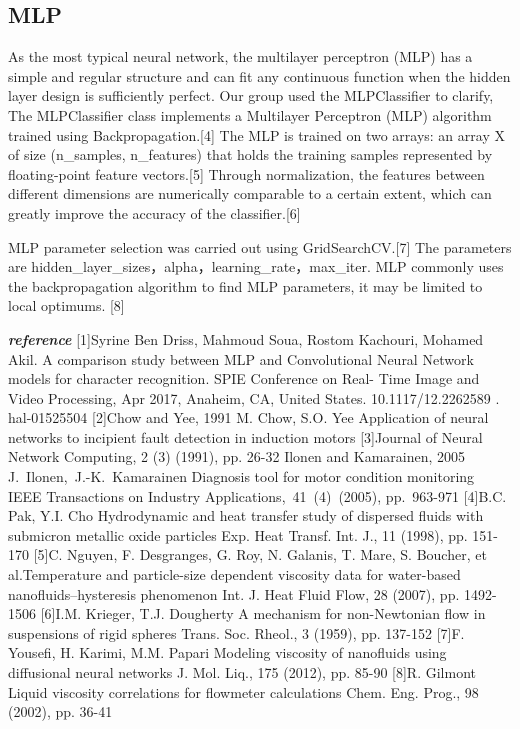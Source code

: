 \subsection{MLP}\label{subsubsec4}
As the most typical neural network, the multilayer perceptron (MLP) has a simple and regular structure and can fit any continuous function when the hidden layer design is sufficiently perfect. Our group used the MLPClassifier to clarify, The MLPClassifier class implements a Multilayer Perceptron (MLP) algorithm trained using Backpropagation.[4] The MLP is trained on two arrays: an array X of size (n_samples, n_features) that holds the training samples represented by floating-point feature vectors.[5] Through normalization, the features between different dimensions are numerically comparable to a certain extent, which can greatly improve the accuracy of the classifier.[6]

MLP parameter selection was carried out using GridSearchCV.[7]
The parameters are hidden_layer_sizes，alpha，learning_rate，max_iter. MLP commonly uses the backpropagation algorithm to find MLP parameters, it may be limited to local optimums. [8]

\textit{\textbf{reference}}
[1]Syrine Ben Driss, Mahmoud Soua, Rostom Kachouri, Mohamed Akil. A comparison study between MLP and Convolutional Neural Network models for character recognition. SPIE Conference on Real- Time Image and Video Processing, Apr 2017, Anaheim, CA, United States. 10.1117/12.2262589 . 
hal-01525504 
[2]Chow and Yee, 1991 M. Chow, S.O. Yee Application of neural networks to incipient fault detection in induction motors
[3]Journal of Neural Network Computing, 2 (3) (1991), pp. 26-32 Ilonen and Kamarainen, 2005 J. Ilonen, J.-K. Kamarainen Diagnosis tool for motor condition monitoring IEEE Transactions on Industry Applications, 41 (4) (2005), pp. 963-971
[4]B.C. Pak, Y.I. Cho Hydrodynamic and heat transfer study of dispersed fluids with submicron metallic oxide particles Exp. Heat Transf. Int. J., 11 (1998), pp. 151-170
[5]C. Nguyen, F. Desgranges, G. Roy, N. Galanis, T. Mare, S. Boucher, et al.Temperature and particle-size dependent viscosity data for water-based nanofluids–hysteresis phenomenon Int. J. Heat Fluid Flow, 28 (2007), pp. 1492-1506
[6]I.M. Krieger, T.J. Dougherty A mechanism for non-Newtonian flow in suspensions of rigid spheres Trans. Soc. Rheol., 3 (1959), pp. 137-152
[7]F. Yousefi, H. Karimi, M.M. Papari Modeling viscosity of nanofluids using diffusional neural networks J. Mol. Liq., 175 (2012), pp. 85-90
[8]R. Gilmont Liquid viscosity correlations for flowmeter calculations Chem. Eng. Prog., 98 (2002), pp. 36-41